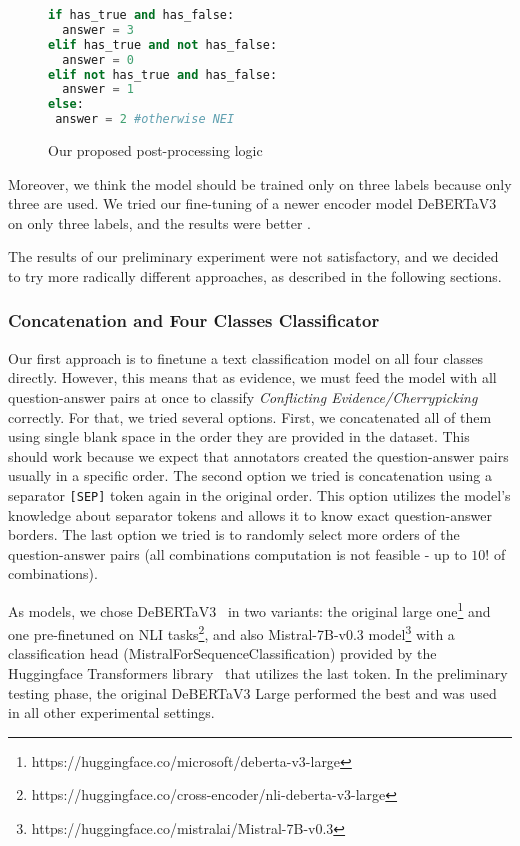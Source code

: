 \begin{figure}
    \begin{lstlisting}[language=Python, frame=single]
if has_true and has_false:
  answer = 3
elif has_true and not has_false:
  answer = 0
elif not has_true and has_false:
  answer = 1
else:
 answer = 2 #otherwise NEI
        \end{lstlisting}
    \caption{Our proposed post-processing logic} 
    \label{lst:post-processing}       
\end{figure}

Moreover, we think the model should be trained only on three labels because only three are used. We tried our fine-tuning of a newer encoder model DeBERTaV3~\cite{he2023debertav3improvingdebertausing} on only three labels, and the results were better .

The results of our preliminary experiment were not satisfactory, and we decided to try more radically different approaches, as described in the following sections.

\subsubsection*{Concatenation and Four Classes Classificator}
\label{subsubsec:concatenation}
Our first approach is to finetune a text classification model on all four classes directly. However, this means that as evidence, we must feed the model with all question-answer pairs at once to classify \textit{Conflicting Evidence/Cherrypicking} correctly. For that, we tried several options. First, we concatenated all of them using single blank space in the order they are provided in the dataset. This should work because we expect that annotators created the question-answer pairs usually in a specific order. The second option we tried is concatenation using a separator \texttt{[SEP]} token again in the original order. This option utilizes the model's knowledge about separator tokens and allows it to know exact question-answer borders. The last option we tried is to randomly select more orders of the question-answer pairs (all combinations computation is not feasible - up to $10!$ of combinations).

As models, we chose DeBERTaV3~\cite{he2023debertav3improvingdebertausing} in two variants: the original large one\footnote{https://huggingface.co/microsoft/deberta-v3-large} and one pre-finetuned on NLI tasks\footnote{https://huggingface.co/cross-encoder/nli-deberta-v3-large}, and also Mistral-7B-v0.3 model\footnote{https://huggingface.co/mistralai/Mistral-7B-v0.3} with a classification head (MistralForSequenceClassification) provided by the Huggingface Transformers library~\cite{wolf-etal-2020-transformers} that utilizes the last token. In the preliminary testing phase, the original DeBERTaV3 Large performed the best and was used in all other experimental settings.

